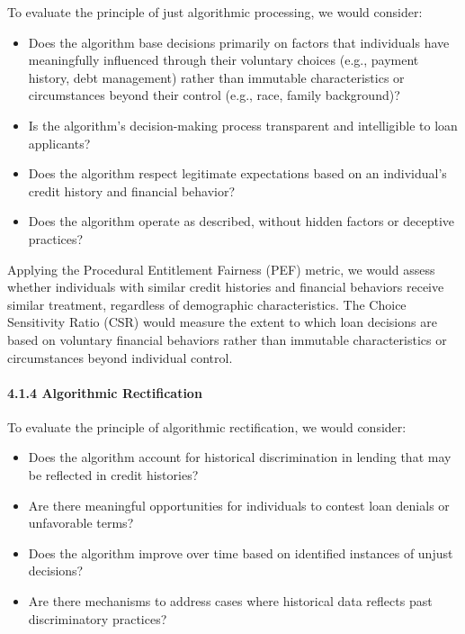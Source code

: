 To evaluate the principle of just algorithmic processing, we would
consider:

\begin{itemize}
\tightlist
\item
  Does the algorithm base decisions primarily on factors that
  individuals have meaningfully influenced through their voluntary
  choices (e.g., payment history, debt management) rather than immutable
  characteristics or circumstances beyond their control (e.g., race,
  family background)?
\item
  Is the algorithm's decision-making process transparent and
  intelligible to loan applicants?
\item
  Does the algorithm respect legitimate expectations based on an
  individual's credit history and financial behavior?
\item
  Does the algorithm operate as described, without hidden factors or
  deceptive practices?
\end{itemize}

Applying the Procedural Entitlement Fairness (PEF) metric, we would
assess whether individuals with similar credit histories and financial
behaviors receive similar treatment, regardless of demographic
characteristics. The Choice Sensitivity Ratio (CSR) would measure the
extent to which loan decisions are based on voluntary financial
behaviors rather than immutable characteristics or circumstances beyond
individual control.

\paragraph{4.1.4 Algorithmic
Rectification}\label{algorithmic-rectification}

To evaluate the principle of algorithmic rectification, we would
consider:

\begin{itemize}
\tightlist
\item
  Does the algorithm account for historical discrimination in lending
  that may be reflected in credit histories?
\item
  Are there meaningful opportunities for individuals to contest loan
  denials or unfavorable terms?
\item
  Does the algorithm improve over time based on identified instances of
  unjust decisions?
\item
  Are there mechanisms to address cases where historical data reflects
  past discriminatory practices?
\end{itemize}

